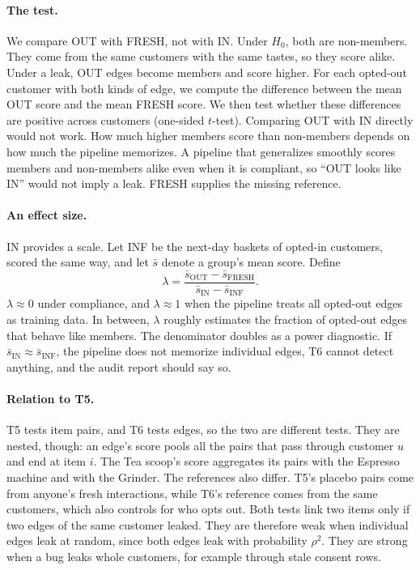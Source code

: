 \documentclass[10pt,twocolumn,letterpaper]{article}
\theoremstyle{definition}
\begin{document}
\paragraph{The test.}
We compare OUT with FRESH, not with IN. Under $H_0$, both are non-members.
They come from the same customers with the same tastes, so they score alike.
Under a leak, OUT edges become members and score higher. For each opted-out
customer with both kinds of edge, we compute the difference between the mean
OUT score and the mean FRESH score. We then test whether these differences are
positive across customers (one-sided $t$-test). Comparing OUT with IN directly
would not work. How much higher members score than non-members depends on how
much the pipeline memorizes. A pipeline that generalizes smoothly scores
members and non-members alike even when it is compliant, so ``OUT looks like
IN'' would not imply a leak. FRESH supplies the missing reference.

\paragraph{An effect size.}
IN provides a scale. Let INF be the next-day baskets of opted-in customers,
scored the same way, and let $\bar s$ denote a group's mean score. Define
\begin{equation}
  \lambda=\frac{\bar s_{\mathrm{OUT}}-\bar s_{\mathrm{FRESH}}}{\bar s_{\mathrm{IN}}-\bar s_{\mathrm{INF}}}.
\end{equation}
$\lambda\approx 0$ under compliance, and $\lambda\approx 1$ when the pipeline treats all
opted-out edges as training data. In between, $\lambda$ roughly estimates the
fraction of opted-out edges that behave like members. The denominator doubles
as a power diagnostic. If $\bar s_{\mathrm{IN}}\approx\bar s_{\mathrm{INF}}$, the pipeline does not
memorize individual edges, T6 cannot detect anything, and the audit report
should say so.

\paragraph{Relation to T5.}
T5 tests item pairs, and T6 tests edges, so the two are different tests. They
are nested, though: an edge's score pools all the pairs that pass through
customer $u$ and end at item $i$. The Tea scoop's score aggregates its pairs with
the Espresso machine and with the Grinder. The references also differ. T5's
placebo pairs come from anyone's fresh interactions, while T6's reference
comes from the same customers, which also controls for who opts out. Both
tests link two items only if two edges of the same customer leaked. They are
therefore weak when individual edges leak at random, since both edges leak
with probability $\rho^2$. They are strong when a bug leaks whole customers,
for example through stale consent rows.
\end{document}
